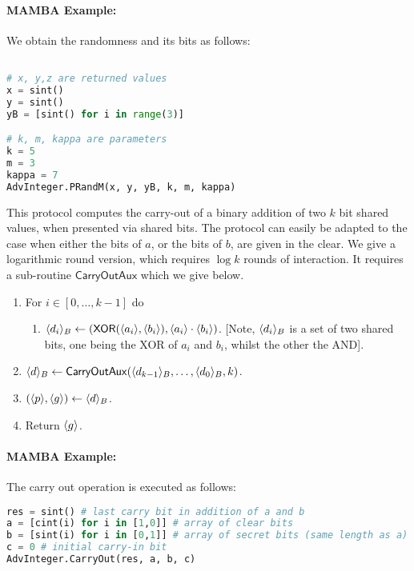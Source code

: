 \paragraph{MAMBA Example:}  We obtain the randomness and its bits as follows:
\begin{lstlisting}[language={python}]

# x, y,z are returned values
x = sint()
y = sint()
yB = [sint() for i in range(3)]

# k, m, kappa are parameters
k = 5
m = 3
kappa = 7
AdvInteger.PRandM(x, y, yB, k, m, kappa)
\end{lstlisting}

This protocol computes the carry-out of a binary addition of
two $k$ bit shared values, when presented via shared bits.
The protocol can easily be adapted to the case when either
the bits of $a$, or the bits of $b$, are given in the clear.
We give a logarithmic round version, which requires $\log k$
rounds of interaction.
It requires a sub-routine $\mathsf{CarryOutAux}$ which we
give below.
\begin{enumerate}
  \item For $i \in [0,\ldots,k-1]$ do
        \begin{enumerate}
          \item $\langle d_i \rangle_B \leftarrow (\mathsf{XOR}(\langle a_i \rangle,\langle b_i \rangle),
                  \langle a_i \rangle\cdot \langle b_i \rangle)$.
                  [Note, $\langle d_i \rangle_B$ is a set of two shared bits, one being the XOR
                    of $a_i$ and $b_i$, whilst the other the AND].
        \end{enumerate}
  \item $\langle d \rangle_B \leftarrow \mathsf{CarryOutAux}(\langle d_{k-1} \rangle_B,\ldots,\langle d_0 \rangle_B,k)$.
  \item $(\langle p \rangle,\langle g \rangle) \leftarrow \langle d \rangle_B$.
  \item Return $\langle g \rangle$.
\end{enumerate}
\paragraph{MAMBA Example:}  The carry out operation is executed as follows:
\begin{lstlisting}[language={python}]
res = sint() # last carry bit in addition of a and b
a = [cint(i) for i in [1,0]] # array of clear bits
b = [sint(i) for i in [0,1]] # array of secret bits (same length as a)
c = 0 # initial carry-in bit
AdvInteger.CarryOut(res, a, b, c)
\end{lstlisting}

